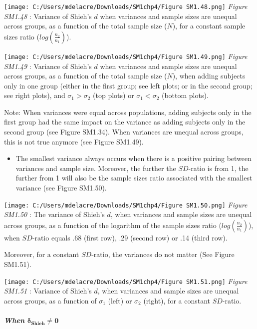 \documentclass[
  english,
  man,mask,floatsintext]{apa6}
\providecommand{\tightlist}{%
  \setlength{\itemsep}{0pt}\setlength{\parskip}{0pt}}
\let\oldsubparagraph\subparagraph
\renewcommand{\subparagraph}[1]{\oldsubparagraph{#1}\mbox{}}
\begin{document}
\texttt{[image: C:/Users/mdelacre/Downloads/SM1chp4/Figure SM1.48.png]}
\emph{Figure SM1.48} : Variance of Shieh's \(d\) when variances and sample sizes are unequal across groups, as a function of the total sample size (\(N\)), for a constant sample sizes ratio (\(log\left(\frac{n_2}{n_1} \right)\)).

\texttt{[image: C:/Users/mdelacre/Downloads/SM1chp4/Figure SM1.49.png]}
\emph{Figure SM1.49} : Variance of Shieh's \(d\) when variances and sample sizes are unequal across groups, as a function of the total sample size (\(N\)), when adding subjects only in one group (either in the first group; see left plots; or in the second group; see right plots), and \(\sigma_1 > \sigma_2\) (top plots) or \(\sigma_1 < \sigma_2\) (bottom plots).

Note: When variances were equal across populations, adding subjects only in the first group had the same impact on the variance as adding subjects only in the second group (see Figure SM1.34). When variances are unequal across groups, this is not true anymore (see Figure SM1.49).

\begin{itemize}
\tightlist
\item
  The smallest variance always occurs when there is a positive pairing between variances and sample size. Moreover, the further the \(SD\)-ratio is from 1, the further from 1 will also be the sample sizes ratio associated with the smallest variance (see Figure SM1.50).
\end{itemize}

\texttt{[image: C:/Users/mdelacre/Downloads/SM1chp4/Figure SM1.50.png]}
\emph{Figure SM1.50} : The variance of Shieh's \(d\), when variances and sample sizes are unequal across groups, as a function of the logarithm of the sample sizes ratio (\(log \left( \frac{n_2}{n_1} \right)\)), when \(SD\)-ratio equals .68 (first row), .29 (second row) or .14 (third row).

Moreover, for a constant \(SD\)-ratio, the variances do not matter (See Figure SM1.51).

\texttt{[image: C:/Users/mdelacre/Downloads/SM1chp4/Figure SM1.51.png]}
\emph{Figure SM1.51} : Variance of Shieh's \(d\), when variances and sample sizes are unequal across groups, as a function of \(\sigma_1\) (left) or \(\sigma_2\) (right), for a constant \(SD\)-ratio.

\hypertarget{when-bmdelta_shieh-neq-0-2}{%
\subparagraph{\texorpdfstring{When \(\bm{\delta_{Shieh} \neq 0}\)}{When \textbackslash bm\{\textbackslash delta\_\{Shieh\} \textbackslash neq 0\}}}\label{when-bmdelta_shieh-neq-0-2}}
\end{document}
